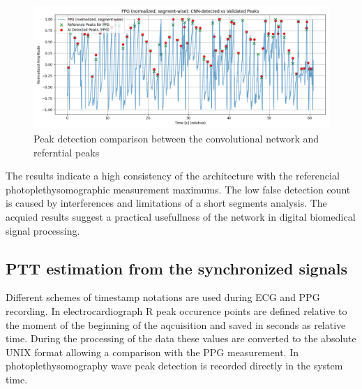 \documentclass[journal]{IEEEtran}
\begin{document}
{%
\begin{figure}[htbp]
    \centering
    \includegraphics[scale=0.28]{ppg_ai_vs_real.png}
    \caption{Peak detection comparison between the convolutional network and referntial peaks}
    \label{fig:ppg_ai_real_peaks}
\end{figure}

\newpage
The results indicate a high consistency of the architecture with the referencial photoplethysomographic measurement maximums. The low false detection count is caused by interferences and limitations of a short segments analysis. The acquied results suggest a practical usefullness of the network in digital biomedical signal processing.


\subsection{PTT estimation from the synchronized signals}
Different schemes of timestamp notations are used during ECG and PPG recording. In electrocardiograph R peak occurence points are defined relative to the moment of the beginning of the aqcuisition and saved in seconds as relative time. During the processing of the data these values are converted to the absolute UNIX format allowing a comparison with the PPG measurement. In photoplethysomography wave peak detection is recorded directly in the system time.

}
\end{document}
